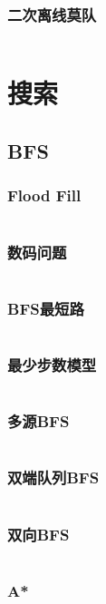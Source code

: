\documentclass[a4paper,12pt]{article}
\begin{document}
\subsubsection{二次离线莫队}
\inputminted[breaklines, linenos]{c++}{ds/offline_mo.cc}


\newpage  
\section{搜索}
\subsection{BFS}
\subsubsection{Flood Fill}
\inputminted[breaklines, linenos]{c++}{search/bfs/flood.cc}
\subsubsection{数码问题}
\inputminted[breaklines, linenos]{c++}{search/bfs/shuma.cc}
\subsubsection{BFS最短路}
\inputminted[breaklines, linenos]{c++}{search/bfs/path.cc}
\subsubsection{最少步数模型}
\inputminted[breaklines, linenos]{c++}{search/bfs/min_step.cc}
\subsubsection{多源BFS}
\inputminted[breaklines, linenos]{c++}{search/bfs/mul_source.cc}
\subsubsection{双端队列BFS}
\inputminted[breaklines, linenos]{c++}{search/bfs/deq_bfs.cc}
\subsubsection{双向BFS}
\inputminted[breaklines, linenos]{c++}{search/bfs/2side_bfs.cc}
\subsubsection{A*}
\inputminted[breaklines, linenos]{c++}{search/bfs/astar.cc}
\end{document}
